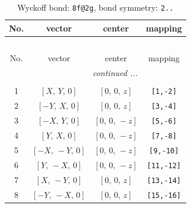 \documentclass[fleqn,8pt]{jsarticle}
\begin{document}
\begin{longtable}{cccc}
\caption{Wyckoff bond: {\tt 8f@2g}, bond symmetry: {\tt 2..}}
 \\
 \hline \hline
No. & vector & center & mapping \\ \hline \endfirsthead

\multicolumn{3}{l}{\tablename\ \thetable{}} \\
 \hline \hline
No. & vector & center & mapping \\ \hline \endhead

 \hline \hline
\multicolumn{3}{r}{\footnotesize\it continued ...} \\ \endfoot

 \hline \hline
\multicolumn{3}{r}{} \\ \endlastfoot

1 & $\left[ X,\, Y,\, 0 \right]$ & $\left[ 0,\, 0,\, z \right]$ & {\tt [1,-2]} \\ \hline
2 & $\left[ - Y,\, X,\, 0 \right]$ & $\left[ 0,\, 0,\, z \right]$ & {\tt [3,-4]} \\ \hline
3 & $\left[ - X,\, Y,\, 0 \right]$ & $\left[ 0,\, 0,\, - z \right]$ & {\tt [5,-6]} \\ \hline
4 & $\left[ Y,\, X,\, 0 \right]$ & $\left[ 0,\, 0,\, - z \right]$ & {\tt [7,-8]} \\ \hline
5 & $\left[ - X,\, - Y,\, 0 \right]$ & $\left[ 0,\, 0,\, - z \right]$ & {\tt [9,-10]} \\ \hline
6 & $\left[ Y,\, - X,\, 0 \right]$ & $\left[ 0,\, 0,\, - z \right]$ & {\tt [11,-12]} \\ \hline
7 & $\left[ X,\, - Y,\, 0 \right]$ & $\left[ 0,\, 0,\, z \right]$ & {\tt [13,-14]} \\ \hline
8 & $\left[ - Y,\, - X,\, 0 \right]$ & $\left[ 0,\, 0,\, z \right]$ & {\tt [15,-16]} \\
\end{longtable}
\renewcommand{\arraystretch}{1.2}
\end{document}
